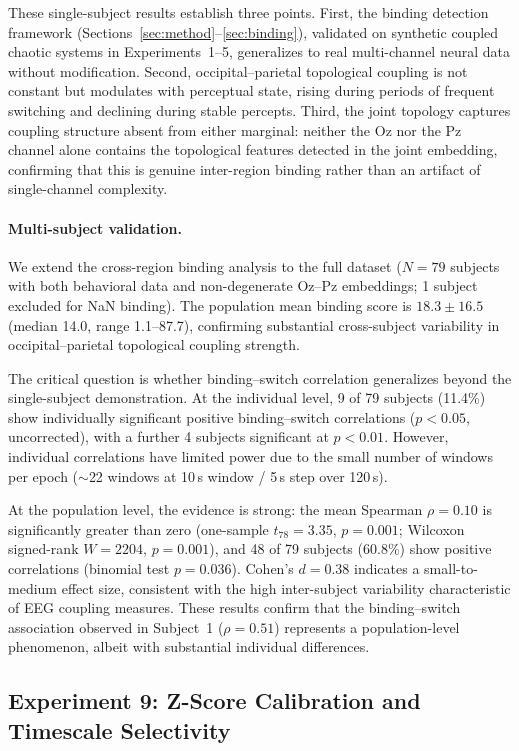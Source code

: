 \documentclass[11pt,a4paper]{article}
\begin{document}
These single-subject results establish three points.
First, the binding detection framework (Sections~\ref{sec:method}--\ref{sec:binding}), validated on synthetic coupled chaotic systems in Experiments~1--5, generalizes to real multi-channel neural data without modification.
Second, occipital--parietal topological coupling is not constant but modulates with perceptual state, rising during periods of frequent switching and declining during stable percepts.
Third, the joint topology captures coupling structure absent from either marginal: neither the Oz nor the Pz channel alone contains the topological features detected in the joint embedding, confirming that this is genuine inter-region binding rather than an artifact of single-channel complexity.

\paragraph{Multi-subject validation.}
We extend the cross-region binding analysis to the full dataset ($N = 79$ subjects with both behavioral data and non-degenerate Oz--Pz embeddings; 1 subject excluded for NaN binding).
The population mean binding score is $18.3 \pm 16.5$ (median 14.0, range 1.1--87.7), confirming substantial cross-subject variability in occipital--parietal topological coupling strength.

The critical question is whether binding--switch correlation generalizes beyond the single-subject demonstration.
At the individual level, 9 of 79 subjects (11.4\%) show individually significant positive binding--switch correlations ($p < 0.05$, uncorrected), with a further 4 subjects significant at $p < 0.01$.
However, individual correlations have limited power due to the small number of windows per epoch ($\sim$22 windows at 10\,s window / 5\,s step over 120\,s).

At the population level, the evidence is strong: the mean Spearman $\rho = 0.10$ is significantly greater than zero (one-sample $t_{78} = 3.35$, $p = 0.001$; Wilcoxon signed-rank $W = 2204$, $p = 0.001$), and 48 of 79 subjects (60.8\%) show positive correlations (binomial test $p = 0.036$).
Cohen's $d = 0.38$ indicates a small-to-medium effect size, consistent with the high inter-subject variability characteristic of EEG coupling measures.
These results confirm that the binding--switch association observed in Subject~1 ($\rho = 0.51$) represents a population-level phenomenon, albeit with substantial individual differences.


\subsection{Experiment 9: Z-Score Calibration and Timescale Selectivity}\label{sec:res-zscore}
\end{document}
